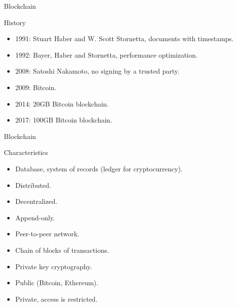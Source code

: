 
\begin{frame}{Blockchain}
  \begin{block}{History}
    \begin{itemize}
      \item 1991: Stuart Haber and W. Scott Stornetta, documents with timestamps. %
      \item 1992: Bayer, Haber and Stornetta, performance optimization.
      \item 2008: Satoshi Nakamoto, no signing by a trusted party.
      \item 2009: Bitcoin.
      \item 2014: 20GB Bitcoin blockchain.
      \item 2017: 100GB Bitcoin blockchain.
    \end{itemize}
  \end{block}
\end{frame}

\begin{frame}{Blockchain}
  \begin{block}{Characteristics}
    \begin{itemize}
      \item Database, system of records (ledger for cryptocurrency).
      \item Distributed.
      \item Decentralized.
      \item Append-only.
      \item Peer-to-peer network.
      \item Chain of blocks of transactions.
      \item Private key cryptography. %
      \item Public (Bitcoin, Ethereum). 
      \item Private, access is restricted.
    \end{itemize}
  \end{block}
\end{frame}

